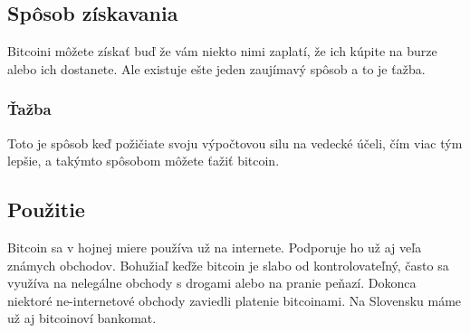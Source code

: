 \subsection{Spôsob získavania} 
Bitcoini môžete získať buď že vám niekto nimi zaplatí, že ich kúpite na burze alebo ich dostanete. Ale existuje ešte jeden zaujímavý spôsob a to je ťažba. 
\subsubsection{Ťažba} 
Toto je spôsob keď požičiate svoju výpočtovou silu na vedecké účeli, čím viac tým lepšie, a takýmto spôsobom môžete ťažiť bitcoin. 
\subsection{Použitie} 
Bitcoin sa v hojnej miere používa už na internete. Podporuje ho už aj veľa známych obchodov. Bohužiaľ keďže bitcoin je slabo od kontrolovateľný, často sa využíva na nelegálne obchody s drogami alebo na pranie peňazí. Dokonca niektoré ne-internetové obchody zaviedli platenie bitcoinami. Na Slovensku máme už aj bitcoinoví bankomat. 
\cite{B} 
